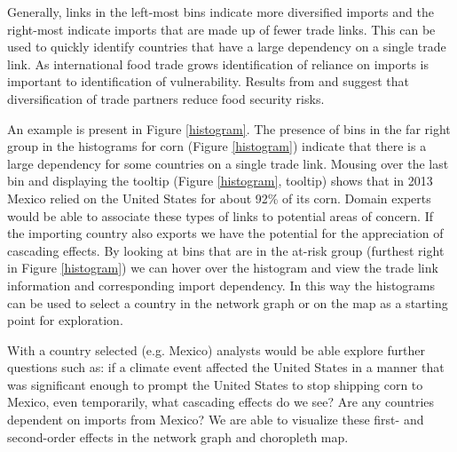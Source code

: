 			Generally, links in the left-most bins indicate more diversified imports and the right-most indicate imports that are made up of fewer trade links. This can be used to quickly identify countries that have a large dependency on a single trade link. As international food trade grows identification of reliance on imports is important to identification of vulnerability. Results from \cite{d2016teleconnected} and \cite{gephart2016vulnerability} suggest that diversification of trade partners reduce food security risks.\par
			An example is present in Figure \ref{histogram}. The presence of bins in the far right group in the histograms for corn (Figure \ref{histogram}) indicate that there is a large dependency for some countries on a single trade link. Mousing over the last bin and displaying the tooltip (Figure \ref{histogram}, tooltip) shows that in 2013 Mexico relied on the United States for about 92\% of its corn. Domain experts would be able to associate these types of links to potential areas of concern. If the importing country also exports we have the potential for the appreciation of cascading effects. By looking at bins that are in the at-risk group (furthest right in Figure \ref{histogram}) we can hover over the histogram and view the trade link information and corresponding import dependency. In this way the histograms can be used to select a country in the network graph or on the map as a starting point for exploration.\par
			With a country selected (e.g. Mexico) analysts would be able explore further questions such as: if a climate event affected the United States in a manner that was significant enough to prompt the United States to stop shipping corn to Mexico, even temporarily, what cascading effects do we see? Are any countries dependent on imports from Mexico? We are able to visualize these first- and second-order effects in the network graph and choropleth map.\par
